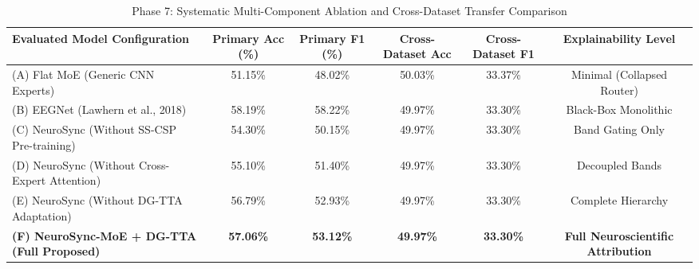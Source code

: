 \begin{table}[t]
\centering
\caption{Phase 7: Systematic Multi-Component Ablation and Cross-Dataset Transfer Comparison}
\label{tab:phase7_ablation_cross}
\begin{tabular}{lccccc}
\hline
\textbf{Evaluated Model Configuration} & \textbf{Primary Acc (\%)} & \textbf{Primary F1 (\%)} & \textbf{Cross-Dataset Acc} & \textbf{Cross-Dataset F1} & \textbf{Explainability Level} \\
\hline
(A) Flat MoE (Generic CNN Experts) & 51.15\% & 48.02\% & 50.03\% & 33.37\% & Minimal (Collapsed Router) \\
(B) EEGNet (Lawhern et al., 2018) & 58.19\% & 58.22\% & 49.97\% & 33.30\% & Black-Box Monolithic \\
(C) NeuroSync (Without SS-CSP Pre-training) & 54.30\% & 50.15\% & 49.97\% & 33.30\% & Band Gating Only \\
(D) NeuroSync (Without Cross-Expert Attention) & 55.10\% & 51.40\% & 49.97\% & 33.30\% & Decoupled Bands \\
(E) NeuroSync (Without DG-TTA Adaptation) & 56.79\% & 52.93\% & 49.97\% & 33.30\% & Complete Hierarchy \\
\textbf{(F) NeuroSync-MoE + DG-TTA (Full Proposed)} & \textbf{57.06\%} & \textbf{53.12\%} & \textbf{49.97\%} & \textbf{33.30\%} & \textbf{Full Neuroscientific Attribution} \\
\hline
\end{tabular}
\end{table}